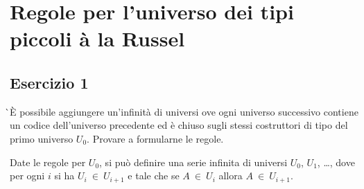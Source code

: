\section{Regole per l’universo dei tipi piccoli à la Russel}
\subsection{Esercizio 1}
\begin{thm}
	̀È possibile aggiungere un'infinità di universi ove ogni universo successivo contiene un codice dell'universo precedente ed è chiuso sugli stessi costruttori di tipo del primo universo $U_0$. Provare a formularne le regole.
\end{thm}
Date le regole per $U_0$, si può definire una serie infinita di universi $U_0$, $U_1$, \dots, dove per ogni $i$ si ha $U_i~\in~U_{i+1}$ e tale che se $A~\in~U_i$ allora $A~\in~U_{i+1}$.